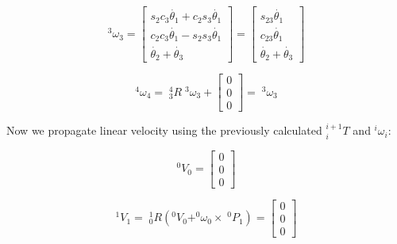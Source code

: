 \begin{Example}
\[
^3\omega_3 = \left[
\begin{array}{c}
s_2c_3\dot{\theta_1} + c_2s_3\dot{\theta_1}	\\
c_2c_3\dot{\theta_1} - s_2s_3\dot{\theta_1}	\\
\dot{\theta_2} + \dot{\theta_3}
\end{array}
\right]
=
\left[
\begin{array}{c}
s_{23}\dot{\theta_1} \\
c_{23}\dot{\theta_1} \\
\dot{\theta_2} + \dot{\theta_3}
\end{array}
\right]
\]



\[
^4\omega_4
= \; ^4_3R \; ^3\omega_3 +
\left[
\begin{array}{c}
0 \\0 \\ 0
\end{array}
\right ] = \; ^3\omega_3
\]





Now we propagate linear velocity using the previously calculated $^{i+1}_iT$ and $^i\omega_i$:

\[
^0V_0 =
\left[
\begin{array}{c}
0 \\0 \\ 0
\end{array}
\right ]
\]

\[
^1V_1 = \;^1_0R(^0V_0 + ^0\omega_0 \times \;^0P_1) =
\left[
\begin{array}{c}
0 \\0 \\ 0
\end{array}
\right ]
\]

\end{Example}
